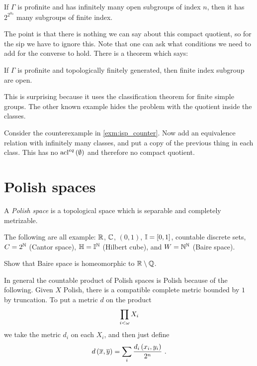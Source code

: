 \documentclass{amsart}
\begin{document}
\begin{prop}
If $\Gamma$ is profinite and has infinitely many open subgroups of index $n$, then it has
$2^{2^{\aleph_0}}$ many subgroups of finite index.
\end{prop}

The point is that there is nothing we can say about this compact quotient, so for the sip
we have to ignore this.
Note that one can ask what conditions we need to add for the converse to hold. There is a
theorem which says:

\begin{thm}
If $\Gamma$ is profinite and topologically finitely generated, then finite index subgroup
are open.
\end{thm}

This is surprising because it uses the classification theorem for finite simple groups.
The other known example hides the problem with the quotient inside the classes.

\begin{exm}
Consider the counterexample in \cref{exm:isp_counter}.
Now add an equivalence relation with infinitely many classes, and put a copy of the
previous thing in each class. 
This has no $\operatorname{acl}^{eq}\left( \emptyset \right)$ and therefore no compact quotient.
\end{exm}

\section{Polish spaces}

\begin{defn}
A \emph{Polish space} is a topological space which is separable and completely metrizable. 
\end{defn}

\begin{exm}
The following are all example:
$\mathbb{R}$, $\mathbb{C}$, $\left( 0,1 \right)$, $\mathbb{I}=\left[ 0,1 \right]$, countable discrete sets, $C =
2^{\mathbb{N}}$ (Cantor space), $\mathbb{H} = \mathbb{I}^{\mathbb{N}}$ (Hilbert cube), and $W = \mathbb{N}^{\mathbb{N}}$ (Baire space).
\end{exm}

\begin{exr}
Show that Baire space is homeomorphic to $\mathbb{R} \setminus \mathbb{Q}$.
\end{exr}

In general the countable product of Polish spaces is Polish because of the
following. 
Given $X$ Polish, there is a compatible complete metric bounded by $1$ by truncation. To
put a metric $d$ on the product
\begin{equation}
\prod_{i<\omega} X_i
\end{equation}
we take the metric $d_i$ on each $X_i$, and then just define
\begin{equation}
d\left( \oline{x} , \oline{y} \right) = \sum_i \frac{d_i\left( x_i , y_i \right)}{2^n} \ .
\end{equation}
\end{document}
